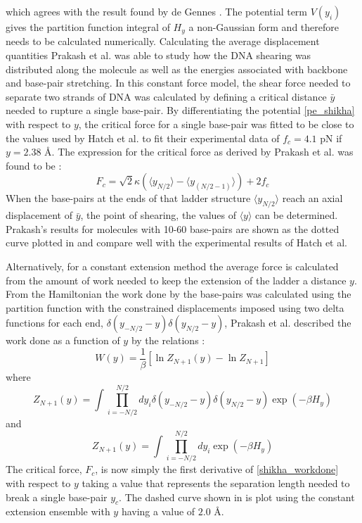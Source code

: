 which agrees with the result found by de Gennes \cite{Prakash2011,DeGennes2001}. The potential term $V\left(y_{i}\right)$ gives the partition function integral of $H_{y}$ a non-Gaussian form and therefore needs to be calculated numerically. Calculating the average displacement quantities Prakash et al. was able to study how the DNA shearing was distributed along the molecule as well as the energies associated with backbone and base-pair stretching. In this constant force model, the shear force needed to separate two strands of DNA was calculated by defining a critical distance $\bar{y}$ needed to rupture a single base-pair. By differentiating the potential \eqref{pe_shikha} with respect to $y$, the critical force for a single base-pair was fitted to be close to the values used by Hatch et al. to fit their experimental data of $f_{c}=4.1$ pN if $y = 2.38$ \AA. The expression for the critical force as derived by Prakash et al. was found to be \cite{Prakash2011}:
%
\begin{equation}
F_{c}=\sqrt{2}\kappa\left(\langle y_{N/2}\rangle - \langle y_{\left(N/2-1\right)}\rangle\right) + 2f_{c}
\end{equation} 
%
When the base-pairs at the ends of that ladder structure $\langle y_{N/2}\rangle$ reach an axial displacement of $\bar{y}$, the point of shearing, the values of $\langle y\rangle$ can be determined. Prakash's results for molecules with 10-60 base-pairs are shown as the dotted curve plotted in  and compare well with the experimental results of Hatch et al. 

Alternatively, for a constant extension method the average force is calculated from the amount of work needed to keep the extension of the ladder a distance $y$. From the Hamiltonian the work done by the base-pairs was calculated using the partition function with the constrained displacements imposed using two delta functions for each end, $\delta\left(y_{-N/2}-y\right)\delta\left(y_{N/2}-y\right)$, Prakash et al. described the work done as a function of $y$ by the relations \cite{Prakash2011}:
%
\begin{equation}
\label{shikha_workdone}
W\left(y\right) = \frac{1}{\beta}\left[\ln Z_{N+1}\left(y\right)-\ln Z_{N+1}\right]
\end{equation}
%
where
%
\begin{equation}
Z_{N+1}\left(y\right)=\int \prod^{N/2}_{i=-N/2}dy_{i}\delta\left(y_{-N/2}-y\right)\delta\left(y_{N/2}-y\right)\exp\left(-\beta H_{y}\right)
\end{equation}
%
and 
%
\begin{equation}
Z_{N+1}\left(y\right)=\int \prod^{N/2}_{i=-N/2}dy_{i}\exp\left(-\beta H_{y}\right)
\end{equation}
%
The critical force, $F_{c}$, is now simply the first derivative of \eqref{shikha_workdone} with respect to $y$ taking a value that represents the separation length needed to break a single base-pair $y_{c}$. The dashed curve shown in  is plot using the constant extension ensemble with $y$ having a value of $2.0$ \AA. 

